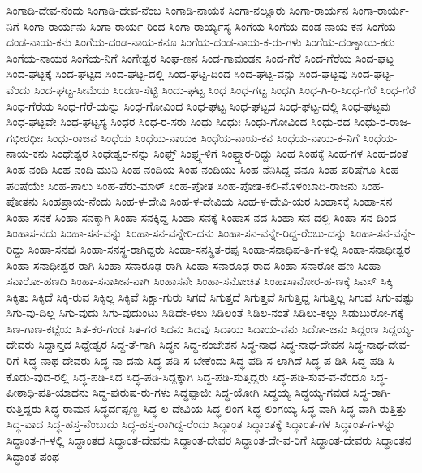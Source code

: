 ಸಿಂಗಾಡಿ-ದೇವ-ನೆಂದು
ಸಿಂಗಾಡಿ-ದೇವ-ನೆಂಬ
ಸಿಂಗಾಡಿ-ನಾಯಕ
ಸಿಂಗಾ-ನಲ್ಲೂರು
ಸಿಂಗಾ-ರಾರ್ಯನ
ಸಿಂಗಾ-ರಾರ್ಯ-ನಿಗೆ
ಸಿಂಗಾ-ರಾರ್ಯನು
ಸಿಂಗಾ-ರಾರ್ಯ-ರಿಂದ
ಸಿಂಗಾ-ರಾರ್ಯ್ಯಸ್ಯ
ಸಿಂಗೆಯ
ಸಿಂಗೆಯ-ದಂಡ-ನಾಯ-ಕನ
ಸಿಂಗೆಯ-ದಂಡ-ನಾಯ-ಕನು
ಸಿಂಗೆಯ-ದಂಡ-ನಾಯ-ಕನೂ
ಸಿಂಗೆಯ-ದಂಡ-ನಾಯ-ಕ-ರು-ಗಳು
ಸಿಂಗೆಯ-ದಂಣ್ನಾಯ-ಕರು
ಸಿಂಗೆಯ-ನಾಯಕ
ಸಿಂಗೆಯ-ನಿಗೆ
ಸಿಂಗೇಶ್ವರ
ಸಿಂಘ-ಣನ
ಸಿಂಡ-ಗಾವುಂಡನ
ಸಿಂದ-ಗೆರೆ
ಸಿಂದ-ಗೆರೆಯ
ಸಿಂದ-ಘಟ್ಟ
ಸಿಂದ-ಘಟ್ಟಕ್ಕೆ
ಸಿಂದ-ಘಟ್ಟದ
ಸಿಂದ-ಘಟ್ಟ-ದಲ್ಲಿ
ಸಿಂದ-ಘಟ್ಟ-ದಿಂದ
ಸಿಂದ-ಘಟ್ಟ-ವನ್ನು
ಸಿಂದ-ಘಟ್ಟವು
ಸಿಂದ-ಘಟ್ಟ-ವೆಂದು
ಸಿಂದ-ಘಟ್ಟ-ಸೀಮೆಯ
ಸಿಂದಣ-ಸೆಟ್ಟಿ
ಸಿಂದು-ಘಟ್ಟ
ಸಿಂಧ
ಸಿಂಧ-ಗಟ್ಟ
ಸಿಂಧಗಿ
ಸಿಂಧ-ಗಿ-ರಿ-ಸಿಂಧ-ಗೆರೆ
ಸಿಂಧ-ಗೆರೆ
ಸಿಂಧ-ಗೆರೆಯ
ಸಿಂಧ-ಗೆರೆ-ಯನ್ನು
ಸಿಂಧ-ಗೋವಿಂದ
ಸಿಂಧ-ಘಟ್ಟ
ಸಿಂಧ-ಘಟ್ಟದ
ಸಿಂಧ-ಘಟ್ಟ-ದಲ್ಲಿ
ಸಿಂಧ-ಘಟ್ಟವು
ಸಿಂಧ-ಘಟ್ಟವೇ
ಸಿಂಧ-ಘಟ್ಟಸ್ಯ
ಸಿಂಧರ
ಸಿಂಧ-ರ-ಸರು
ಸಿಂಧು
ಸಿಂಧುಃ
ಸಿಂಧು-ಗೋವಿಂದ
ಸಿಂಧು-ರದ
ಸಿಂಧು-ರ-ರಾಜ-ಗಭೀರಧೀಃ
ಸಿಂಧು-ರಾಜನ
ಸಿಂಧೆಯ
ಸಿಂಧೆಯ-ನಾಯಕ
ಸಿಂಧೆಯ-ನಾಯ-ಕನ
ಸಿಂಧೆಯ-ನಾಯ-ಕ-ನಿಗೆ
ಸಿಂಧೆಯ-ನಾಯ-ಕನು
ಸಿಂಧೇಶ್ವರ
ಸಿಂಧೇಶ್ವರ-ನನ್ನು
ಸಿಂಫ್ತ್
ಸಿಂಫ್ತ್ಗ-ಳಿಗೆ
ಸಿಂಫ್ತ್ದಾರ-ರಿದ್ದು
ಸಿಂಹ
ಸಿಂಹಕ್ಕೆ
ಸಿಂಹ-ಗಳ
ಸಿಂಹ-ದಂತೆ
ಸಿಂಹ-ನಂದಿ
ಸಿಂಹ-ನಂದಿ-ಮುನಿ
ಸಿಂಹ-ನಂದಿಯ
ಸಿಂಹ-ನಂದಿಯು
ಸಿಂಹ-ನೆನಿಸಿದ್ದ-ವನೂ
ಸಿಂಹ-ಪರಿಷೆಗೂ
ಸಿಂಹ-ಪರಿಷೆಯೇ
ಸಿಂಹ-ಪಾಲು
ಸಿಂಹ-ಪೆರು-ಮಾಳ್
ಸಿಂಹ-ಪೋತ
ಸಿಂಹ-ಪೋತ-ಕಲಿ-ನೊಳಂಬಾದಿ-ರಾಜನು
ಸಿಂಹ-ಪೋತನು
ಸಿಂಹಪ್ರಾಯ-ನೆಂದು
ಸಿಂಹ-ಳ-ದೇವಿ
ಸಿಂಹ-ಳ-ದೇವಿಯ
ಸಿಂಹ-ಳ-ದೇವಿ-ಯರ
ಸಿಂಹಾಸಕ್ಕೆ
ಸಿಂಹಾ-ಸನ
ಸಿಂಹಾ-ಸನಕೆ
ಸಿಂಹಾ-ಸನಕ್ಕಾಗಿ
ಸಿಂಹಾ-ಸನಕ್ಕಿದ್ದ
ಸಿಂಹಾ-ಸನಕ್ಕೆ
ಸಿಂಹಾಸ-ನದ
ಸಿಂಹಾ-ಸನ-ದಲ್ಲಿ
ಸಿಂಹಾ-ಸನ-ದಿಂದ
ಸಿಂಹಾಸ-ನದು
ಸಿಂಹಾ-ಸನ-ವನ್ನು
ಸಿಂಹಾ-ಸನ-ವನ್ನೇರಿ-ದನು
ಸಿಂಹಾ-ಸನ-ವನ್ನೇ-ರಿದ್ದ-ರೆಂಬು-ದನ್ನು
ಸಿಂಹಾ-ಸನ-ವನ್ನೇ-ರಿದ್ದು
ಸಿಂಹಾ-ಸನವು
ಸಿಂಹಾ-ಸನಸ್ಥ-ರಾಗಿದ್ದರು
ಸಿಂಹಾ-ಸನಸ್ಥಿತ-ರಪ್ಪ
ಸಿಂಹಾ-ಸನಾಧಿಪ-ತಿ-ಗ-ಳಲ್ಲಿ
ಸಿಂಹಾ-ಸನಾಧೀಶ್ವರ
ಸಿಂಹಾ-ಸನಾಧೀಶ್ವರ-ರಾಗಿ
ಸಿಂಹಾ-ಸನಾರೂಢ-ರಾಗಿ
ಸಿಂಹಾ-ಸನಾರೂಢ-ರಾದ
ಸಿಂಹಾ-ಸನಾರೋ-ಹಣ
ಸಿಂಹಾ-ಸನಾರೋ-ಹಣದಿ
ಸಿಂಹಾ-ಸನಾಸೀನ-ನಾಗಿ
ಸಿಂಹಾಸನೇ
ಸಿಂಹಾ-ಸನೋಚಿತ
ಸಿಂಹಾಸಾನೋರ-ಹ-ಣಕ್ಕೆ
ಸಿಎಸ್
ಸಿಕ್ಕಿ
ಸಿಕ್ಕಿತು
ಸಿಕ್ಕಿದೆ
ಸಿಕ್ಕಿ-ರುವ
ಸಿಕ್ಕಿಲ್ಲ
ಸಿಕ್ಕಿವೆ
ಸಿಕ್ಷಾ-ಗುರು
ಸಿಗದೆ
ಸಿಗುತ್ತದೆ
ಸಿಗುತ್ತವೆ
ಸಿಗುತ್ತಿದ್ದ
ಸಿಗುತ್ತಿಲ್ಲ
ಸಿಗುವ
ಸಿಗು-ವಷ್ಟು
ಸಿಗು-ವು-ದಿಲ್ಲ
ಸಿಗು-ವುದು
ಸಿಗು-ವುದುಂಟು
ಸಿಡಿದೇ-ಳಲು
ಸಿಡಿಲಂತೆ
ಸಿಡಿಲ-ನಂತೆ
ಸಿಡಿಲು-ಕಲ್ಲು
ಸಿಡುಬುರೋ-ಗಕ್ಕೆ
ಸಿಣ-ಗಾಣ-ಕಟ್ಟೆಯ
ಸಿತ-ಕರ-ಗಂಡ
ಸಿತ-ಗರ
ಸಿದನು
ಸಿದವು
ಸಿದಾಯ
ಸಿದಾಯ-ವನು
ಸಿದೋ-ಜನು
ಸಿದ್ದಂಣ
ಸಿದ್ದಯ್ಯ-ದೇವರು
ಸಿದ್ದಾನ್ತದ
ಸಿದ್ದೇಶ್ವರ
ಸಿದ್ಧ-ತೆ-ಗಾಗಿ
ಸಿದ್ಧನ
ಸಿದ್ಧ-ನಂಜೇಶನ
ಸಿದ್ಧ-ನಾಥ
ಸಿದ್ಧ-ನಾಥ-ದೇವನ
ಸಿದ್ಧ-ನಾಥ-ದೇವ-ರಿಗೆ
ಸಿದ್ಧ-ನಾಥ-ದೇವರು
ಸಿದ್ಧ-ನಾ-ದನು
ಸಿದ್ಧ-ಪಡಿ-ಸ-ಬೇಕೆಂದು
ಸಿದ್ಧ-ಪಡಿ-ಸ-ಲಾಗಿದೆ
ಸಿದ್ಧ-ಪ-ಡಿಸಿ
ಸಿದ್ಧ-ಪಡಿ-ಸಿ-ಕೊಡು-ವುದ-ರಲ್ಲಿ
ಸಿದ್ಧ-ಪಡಿ-ಸಿದ
ಸಿದ್ಧ-ಪಡಿ-ಸಿದ್ದಕ್ಕಾಗಿ
ಸಿದ್ಧ-ಪಡಿ-ಸುತ್ತಿದ್ದರು
ಸಿದ್ಧ-ಪಡಿ-ಸುವ-ವ-ನೆಂದೂ
ಸಿದ್ಧ-ಪೀಠಾಧಿ-ಪತಿ-ಯಾದನು
ಸಿದ್ಧ-ಪುರುಷ-ರು-ಗಳು
ಸಿದ್ಧಪ್ಪಾಜೀ
ಸಿದ್ಧ-ಯೋಗಿ
ಸಿದ್ಧಯ್ಯ
ಸಿದ್ಧಯ್ಯ-ಗವುಡ
ಸಿದ್ಧ-ರಾಗಿ-ರುತ್ತಿದ್ದರು
ಸಿದ್ಧ-ರಾಮನ
ಸಿದ್ಧರ್ದಪ್ಪಣ್ಣ
ಸಿದ್ಧ-ಲ-ದೇವಿಯ
ಸಿದ್ಧ-ಲಿಂಗ
ಸಿದ್ಧ-ಲಿಂಗಯ್ಯ
ಸಿದ್ಧ-ವಾಗಿ
ಸಿದ್ಧ-ವಾಗಿ-ರುತ್ತಿತ್ತು
ಸಿದ್ಧ-ವಾದ
ಸಿದ್ಧ-ಹಸ್ತ-ನೆಂಬುದು
ಸಿದ್ಧ-ಹಸ್ತ-ರಾಗಿದ್ದ-ರೆಂದು
ಸಿದ್ಧಾಂತ
ಸಿದ್ಧಾಂತಕ್ಕೆ
ಸಿದ್ಧಾಂತ-ಗಳ
ಸಿದ್ಧಾಂತ-ಗ-ಳನ್ನು
ಸಿದ್ಧಾಂತ-ಗ-ಳಲ್ಲಿ
ಸಿದ್ಧಾಂತದ
ಸಿದ್ಧಾಂತ-ದೇವನು
ಸಿದ್ಧಾಂತ-ದೇವರ
ಸಿದ್ಧಾಂತ-ದೇ-ವ-ರಿಗೆ
ಸಿದ್ಧಾಂತ-ದೇವರು
ಸಿದ್ಧಾಂತನ
ಸಿದ್ಧಾಂತ-ಪಂಥ
